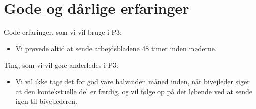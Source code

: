 \section{Gode og d\aa{}rlige erfaringer}
Gode erfaringer, som vi vil bruge i P3:
\begin{itemize}
\item Vi pr\o{}vede altid at sende arbejdsbladene 48 timer inden m\o{}derne.
\end{itemize}
Ting, som vi vil g\o{}re anderledes i P3:
\begin{itemize}
\item Vi vil ikke tage det for god vare halvanden m\aa{}ned inden, når bivejleder siger at den kontekstuelle del er f\ae{}rdig, og vil f\o{}lge op på det l\o{}bende ved at sende igen til bivejlederen.
\end{itemize}